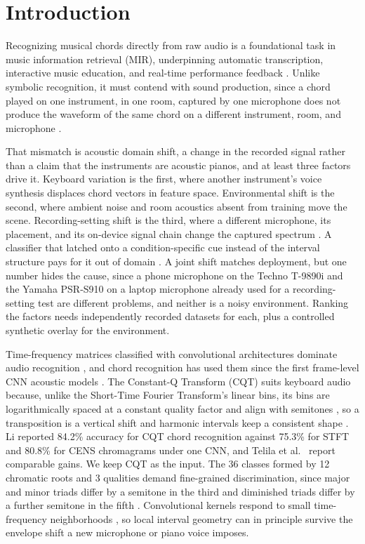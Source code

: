 \documentclass[pdflatex,sn-mathphys-num,iicol]{sn-jnl}
\begin{document}
\section{Introduction}\label{sec_introduction}

Recognizing musical chords directly from raw audio is a foundational task in music information retrieval (MIR), underpinning automatic transcription, interactive music education, and real-time performance feedback \cite{Telila2023}. Unlike symbolic recognition, it must contend with sound production, since a chord played on one instrument, in one room, captured by one microphone does not produce the waveform of the same chord on a different instrument, room, and microphone \cite{Kusaka2024}.

That mismatch is acoustic domain shift, a change in the recorded signal rather than a claim that the instruments are acoustic pianos, and at least three factors drive it. Keyboard variation is the first, where another instrument's voice synthesis displaces chord vectors in feature space. Environmental shift is the second, where ambient noise and room acoustics absent from training move the scene. Recording-setting shift is the third, where a different microphone, its placement, and its on-device signal chain change the captured spectrum \cite{Kusaka2024,Majchrzak2025}. A classifier that latched onto a condition-specific cue instead of the interval structure pays for it out of domain \cite{Geirhos2020}. A joint shift matches deployment, but one number hides the cause, since a phone microphone on the Techno T-9890i and the Yamaha PSR-S910 on a laptop microphone already used for a recording-setting test are different problems, and neither is a noisy environment. Ranking the factors needs independently recorded datasets for each, plus a controlled synthetic overlay for the environment.

Time-frequency matrices classified with convolutional architectures dominate audio recognition \cite{Wolf-Monheim2025}, and chord recognition has used them since the first frame-level CNN acoustic models \cite{Korzeniowski2016}. The Constant-Q Transform (CQT) suits keyboard audio because, unlike the Short-Time Fourier Transform's linear bins, its bins are logarithmically spaced at a constant quality factor and align with semitones \cite{Lacoste2007}, so a transposition is a vertical shift and harmonic intervals keep a consistent shape \cite{Li2021}. Li \cite{Li2021} reported 84.2\% accuracy for CQT chord recognition against 75.3\% for STFT and 80.8\% for CENS chromagrams under one CNN, and Telila et al.\ \cite{Telila2023} report comparable gains. We keep CQT as the input. The 36 classes formed by 12 chromatic roots and 3 qualities demand fine-grained discrimination, since major and minor triads differ by a semitone in the third and diminished triads differ by a further semitone in the fifth \cite{Harte2010}. Convolutional kernels respond to small time-frequency neighborhoods \cite{Purwono2022}, so local interval geometry can in principle survive the envelope shift a new microphone or piano voice imposes.
\end{document}
